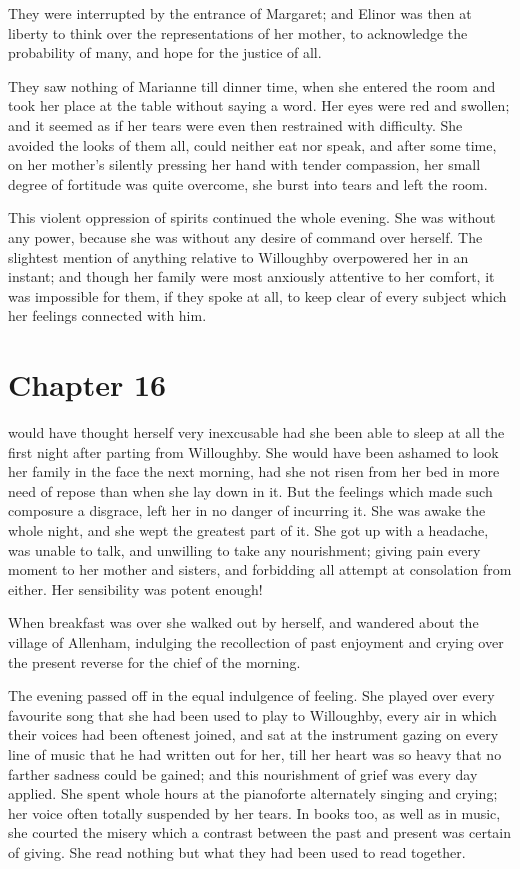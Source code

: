 They were interrupted by the entrance of Margaret;
and Elinor was then at liberty to think over the representations
of her mother, to acknowledge the probability of many,
and hope for the justice of all.

They saw nothing of Marianne till dinner time,
when she entered the room and took her place at the table
without saying a word.  Her eyes were red and swollen;
and it seemed as if her tears were even then restrained
with difficulty.  She avoided the looks of them all,
could neither eat nor speak, and after some time, on her
mother's silently pressing her hand with tender compassion,
her small degree of fortitude was quite overcome, she burst
into tears and left the room.

This violent oppression of spirits continued the
whole evening.  She was without any power, because she
was without any desire of command over herself.
The slightest mention of anything relative to Willoughby
overpowered her in an instant; and though her family
were most anxiously attentive to her comfort, it was
impossible for them, if they spoke at all, to keep clear
of every subject which her feelings connected with him.



\chapter{Chapter 16}


 would have thought herself very inexcusable
had she been able to sleep at all the first night
after parting from Willoughby.  She would have been
ashamed to look her family in the face the next morning,
had she not risen from her bed in more need of repose
than when she lay down in it.  But the feelings which
made such composure a disgrace, left her in no danger
of incurring it.  She was awake the whole night, and she
wept the greatest part of it.  She got up with a headache,
was unable to talk, and unwilling to take any nourishment;
giving pain every moment to her mother and sisters,
and forbidding all attempt at consolation from either.
Her sensibility was potent enough!

When breakfast was over she walked out by herself,
and wandered about the village of Allenham, indulging the
recollection of past enjoyment and crying over the present
reverse for the chief of the morning.

The evening passed off in the equal indulgence of feeling.
She played over every favourite song that she had been used
to play to Willoughby, every air in which their voices
had been oftenest joined, and sat at the instrument gazing
on every line of music that he had written out for her,
till her heart was so heavy that no farther sadness
could be gained; and this nourishment of grief was every
day applied.  She spent whole hours at the pianoforte
alternately singing and crying; her voice often totally
suspended by her tears.  In books too, as well as in music,
she courted the misery which a contrast between the past
and present was certain of giving.  She read nothing
but what they had been used to read together.

